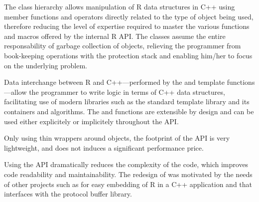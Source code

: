 The class hierarchy allows manipulation of R data structures in C++ 
using member functions and operators directly related to the type
of object being used, therefore reducing the level of expertise
required to master the various functions and macros offered by the
internal R API. The classes assume the entire 
responsability of garbage collection of objects, relieving the 
programmer from book-keeping operations with the protection stack 
and enabling him/her to focus on the underlying problem. 

Data interchange between R and C++---performed by the 
 and  template functions---allow the programmer
to write logic in terms of C++ data structures, facilitating use
of modern libraries such as the standard template library and its 
containers and algorithms. The  and  functions are extensible
by design and can be used either explicitely or implicitely throughout 
the API. 

Only using thin wrappers around  objects, 
the footprint of the  API is very lightweight, and does not 
induces a significant performance price. 

Using the  API dramatically reduces the complexity 
of the code, which improves code readability and maintainability.
The redesign of  was motivated by the needs of other 
projects such as   \citep{cran:rinside} for easy embedding 
of R in a C++ application and  \citep{cran:rprotobuf} 
that interfaces with the protocol buffer library. 



\address{Dirk Eddelbuettel\\
  Debian Project\\
  Chicago, IL\\
  USA}\\

\address{Romain Fran\c{c}ois\\
  Professionnal R Enthusiast\\
  3 rue Emile Bonnet, 34 090 Montpellier\\
  FRANCE}\\

